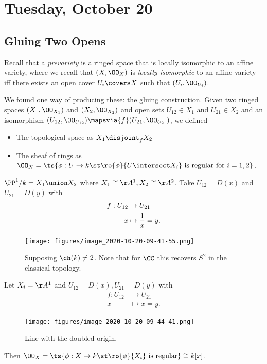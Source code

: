\hypertarget{tuesday-october-20}{%
\section{Tuesday, October 20}\label{tuesday-october-20}}

\hypertarget{gluing-two-opens}{%
\subsection{Gluing Two Opens}\label{gluing-two-opens}}

Recall that a \emph{prevariety} is a ringed space that is locally
isomorphic to an affine variety, where we recall that \((X, \OO_X)\) is
\emph{locally isomorphic} to an affine variety iff there exists an open
cover \(U_i \covers X\) such that \((U_i, \OO_{U_i})\).

We found one way of producing these: the gluing construction. Given two
ringed spaces \((X_1, \OO_{X_1})\) and \((X_2, \OO_{X_2})\) and open
sets \(U_{12} \in X_1\) and \(U_{21} \in X_2\) and an isomorphism
\((U_{12}, \OO_{U_{12}}) \mapsvia{f} (U_{21}, \OO_{U_{21}})\), we
defined

\begin{itemize}
\tightlist
\item
  The topological space as \(X_1 \disjoint_f X_2\)
\item
  The sheaf of rings as
  \(\OO_X = \ts{\phi:U\to k \st\ro{\phi}{U\intersect X_i} \text{ is regular for } i=1,2 }\).
\end{itemize}

\begin{example}

\(\PP^1/k = X_1 \union X_2\) where \(X_1 \cong \AA^1, X_2 \cong \AA^2\).
Take \(U_{12} = D(x)\) and \(U_{21} = D(y)\) with
\begin{align*}  
f: U_{12} &\to U_{21} \\
x &\mapsto {1\over x} = y
.\end{align*}

\begin{figure}
\centering
\texttt{[image: figures/image\_2020-10-20-09-41-55.png]}
\caption{Supposing \(\ch(k) \neq 2\). Note that for \(\CC\) this
recovers \(S^2\) in the classical topology.}
\end{figure}

\end{example}

\begin{example}

Let \(X_i = \AA^1\) and \(U_{12} = D(x), U_{21} = D(y)\) with
\begin{align*}  
f: U_{12} &\to U_{21} \\
x &\mapsto x=y
.\end{align*}

\begin{figure}
\centering
\texttt{[image: figures/image\_2020-10-20-09-44-41.png]}
\caption{Line with the doubled origin.}
\end{figure}

Then
\(\OO_X = \ts{\phi: X\to k \st \ro{\phi}{X_i} \text{ is regular}} \cong k[x]\).

\end{example}

